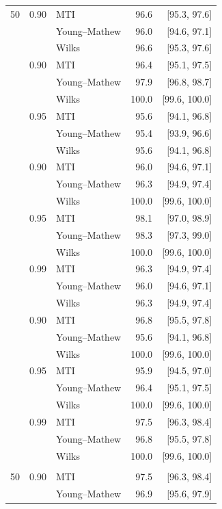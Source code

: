 \begin{longtable}{@{}rrlrr@{}}
50 & 0.90 & MTI & 96.6 & [95.3, 97.6] \\
 &  & Young--Mathew & 96.0 & [94.6, 97.1] \\
 &  & Wilks & 96.6 & [95.3, 97.6] \\
\addlinespace[0.2em]
100 & 0.90 & MTI & 96.4 & [95.1, 97.5] \\
 &  & Young--Mathew & 97.9 & [96.8, 98.7] \\
 &  & Wilks & 100.0 & [99.6, 100.0] \\
\addlinespace[0.2em]
100 & 0.95 & MTI & 95.6 & [94.1, 96.8] \\
 &  & Young--Mathew & 95.4 & [93.9, 96.6] \\
 &  & Wilks & 95.6 & [94.1, 96.8] \\
\addlinespace[0.2em]
500 & 0.90 & MTI & 96.0 & [94.6, 97.1] \\
 &  & Young--Mathew & 96.3 & [94.9, 97.4] \\
 &  & Wilks & 100.0 & [99.6, 100.0] \\
\addlinespace[0.2em]
500 & 0.95 & MTI & 98.1 & [97.0, 98.9] \\
 &  & Young--Mathew & 98.3 & [97.3, 99.0] \\
 &  & Wilks & 100.0 & [99.6, 100.0] \\
\addlinespace[0.2em]
500 & 0.99 & MTI & 96.3 & [94.9, 97.4] \\
 &  & Young--Mathew & 96.0 & [94.6, 97.1] \\
 &  & Wilks & 96.3 & [94.9, 97.4] \\
\addlinespace[0.2em]
1000 & 0.90 & MTI & 96.8 & [95.5, 97.8] \\
 &  & Young--Mathew & 95.6 & [94.1, 96.8] \\
 &  & Wilks & 100.0 & [99.6, 100.0] \\
\addlinespace[0.2em]
1000 & 0.95 & MTI & 95.9 & [94.5, 97.0] \\
 &  & Young--Mathew & 96.4 & [95.1, 97.5] \\
 &  & Wilks & 100.0 & [99.6, 100.0] \\
\addlinespace[0.2em]
1000 & 0.99 & MTI & 97.5 & [96.3, 98.4] \\
 &  & Young--Mathew & 96.8 & [95.5, 97.8] \\
 &  & Wilks & 100.0 & [99.6, 100.0] \\
\addlinespace[0.2em]
\multicolumn{5}{@{}l}{\textit{Student t(3)}}\\
50 & 0.90 & MTI & 97.5 & [96.3, 98.4] \\
 &  & Young--Mathew & 96.9 & [95.6, 97.9] \\

\end{longtable}
